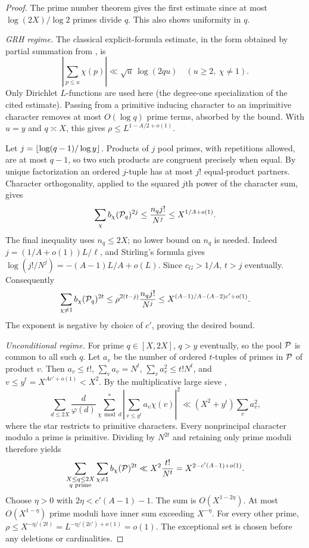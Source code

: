 \documentclass[11pt]{article}
\theoremstyle{remark}\newtheorem{remark}[theorem]{Remark}
\begin{document}
\begin{proof}
The prime number theorem gives the first estimate since at most $\log(2X)/\log2$ primes divide $q$. This also shows uniformity in $q$.

\emph{GRH regime.} The classical explicit-formula estimate, in the form obtained by partial summation from \cite[Eq.~(2.6)]{jmv}, is
\[
 \left|\sum_{p\le u}\chi(p)\right|\ll \sqrt u\,\log(2qu) \quad (u\ge2,\ \chi\ne1).
\]
Only Dirichlet $L$-functions are used here (the degree-one specialization of the cited estimate). Passing from a primitive inducing character to an imprimitive character removes at most $O(\log q)$ prime terms, absorbed by the bound. With $u=y$ and $q\asymp X$, this gives $\rho\le L^{1-A/2+o(1)}$.

Let $j=\lfloor\log(q-1)/\log y\rfloor$. Products of $j$ pool primes, with repetitions allowed, are at most $q-1$, so two such products are congruent precisely when equal. By unique factorization an ordered $j$-tuple has at most $j!$ equal-product partners. Character orthogonality, applied to the squared $j$th power of the character sum, gives
\begin{equation}\label{eq:collision}
 \sum_{\chi} b_\chi(\mathcal P_q)^{2j}\le \frac{n_q j!}{N^j}\le X^{1/A+o(1)}.
\end{equation}
The final inequality uses $n_q\le2X$; no lower bound on $n_q$ is needed. Indeed $j=(1/A+o(1))L/\ell$, and Stirling's formula gives $\log(j!/N^j)=-(A-1)L/A+o(L)$. Since $c_G>1/A$, $t>j$ eventually. Consequently
\[
 \sum_{\chi\ne1}b_\chi(\mathcal P_q)^{2t}
 \le \rho^{2(t-j)}\frac{n_qj!}{N^j}
 \le X^{(A-1)/A-(A-2)c'+o(1)}.
\]
The exponent is negative by choice of $c'$, proving the desired bound.

\emph{Unconditional regime.} For prime $q\in[X,2X]$, $q>y$ eventually, so the pool $\mathcal P$ is common to all such $q$. Let $a_v$ be the number of ordered $t$-tuples of primes in $\mathcal P$ of product $v$. Then $a_v\le t!$, $\sum_v a_v=N^t$, $\sum_v a_v^2\le t!N^t$, and $v\le y^t=X^{Ac'+o(1)}<X^2$. By the multiplicative large sieve \cite[Thm.~25.15]{kouk},
\[
 \sum_{d\le2X}\frac d{\varphi(d)}\sum_{\chi\bmod d}^{*}
 \left|\sum_{v\le y^t} a_v\chi(v)\right|^2
 \ll (X^2+y^t)\sum_v a_v^2,
\]
where the star restricts to primitive characters. Every nonprincipal character modulo a prime is primitive. Dividing by $N^{2t}$ and retaining only prime moduli therefore yields
\begin{equation}\label{eq:sieve}
 \sum_{\substack{X\le q\le 2X\\q\text{ prime}}}\sum_{\chi\ne1}b_\chi(\mathcal P)^{2t}
 \ll X^2\frac{t!}{N^t}=X^{2-c'(A-1)+o(1)}.
\end{equation}
Choose $\eta>0$ with $2\eta<c'(A-1)-1$. The sum is $O(X^{1-2\eta})$. At most $O(X^{1-\eta})$ prime moduli have inner sum exceeding $X^{-\eta}$. For every other prime, $\rho\le X^{-\eta/(2t)}=L^{-\eta/(2c')+o(1)}=o(1)$. The exceptional set is chosen before any deletions or cardinalities.
\end{proof}
\end{document}
